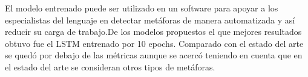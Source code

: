 \begin{conclusions}
	El modelo entrenado puede ser utilizado en un software para apoyar a los especialistas del lenguaje en detectar metáforas de manera automatizada y así reducir su carga de trabajo.De los modelos propuestos el que mejores resultados obtuvo fue el LSTM entrenado por 10 epochs. Comparado con el estado del arte se quedó por debajo de las métricas aunque se acercó teniendo en cuenta que en el estado del arte se consideran otros tipos de metáforas.
\end{conclusions}
